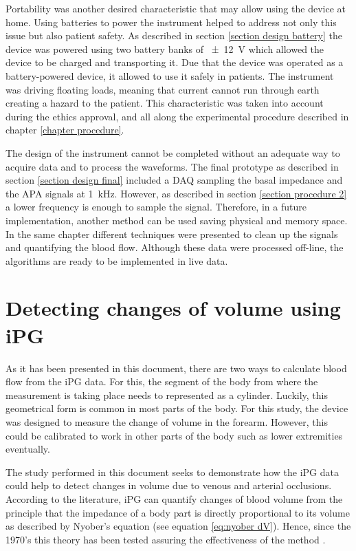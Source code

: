 Portability was another desired characteristic that may allow using the device at home. Using batteries to power the instrument helped to address not only this issue but also patient safety. As described in section \ref{section design battery} the device was powered using two battery banks of \SI{\pm 12}{\volt} which allowed the device to be charged and transporting it. Due that the device was operated as a battery-powered device, it allowed to use it safely in patients. The instrument was driving floating loads, meaning that current cannot run through earth creating a hazard to the patient. This characteristic was taken into account during the ethics approval, and all along the experimental procedure described in chapter \ref{chapter procedure}.

The design of the instrument cannot be completed without an adequate way to acquire data and to process the waveforms. The final prototype as described in section \ref{section design final} included a DAQ sampling the basal impedance and the APA signals at \SI{1}{\kHz}. However, as described in section \ref{section procedure 2} a lower frequency is enough to sample the signal. Therefore, in a future implementation, another method can be used saving physical and memory space. In the same chapter different techniques were presented to clean up the signals and quantifying the blood flow. Although these data were processed off-line, the algorithms are ready to be implemented in live data.

\section{Detecting changes of volume using iPG} %
\label{section discussion 1}
As it has been presented in this document, there are two ways to calculate blood flow from the iPG data. For this, the segment of the body from where the measurement is taking place needs to represented as a cylinder. Luckily, this geometrical form is common in most parts of the body. For this study, the device was designed to measure the change of volume in the forearm. However, this could be calibrated to work in other parts of the body such as lower extremities eventually. 

The study performed in this document seeks to demonstrate how the iPG data could help to detect changes in volume due to venous and arterial occlusions. According to the literature, iPG can quantify changes of blood volume from the principle that the impedance of a body part is directly proportional to its volume as described by Nyober's equation  (see equation \ref{eq:nyober dV}). Hence, since the 1970's this theory has been tested assuring the effectiveness of the method . 

